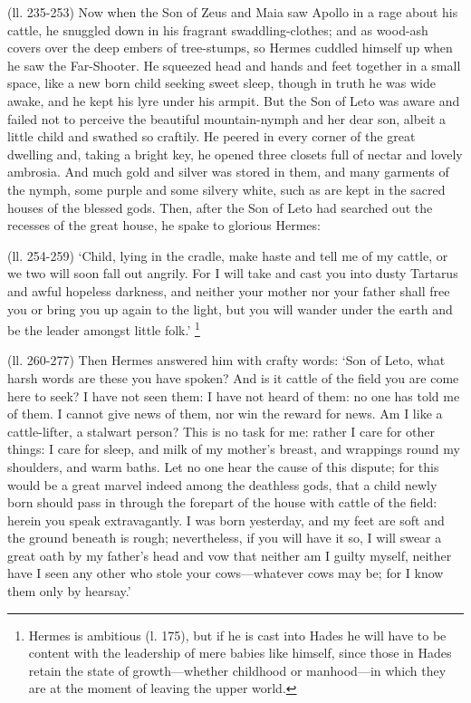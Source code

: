 (ll. 235-253) Now when the Son of Zeus and Maia saw Apollo in a rage about his
cattle, he snuggled down in his fragrant swaddling-clothes; and as wood-ash
covers over the deep embers of tree-stumps, so Hermes cuddled himself up when
he saw the Far-Shooter. He squeezed head and hands and feet together in a small
space, like a new born child seeking sweet sleep, though in truth he was wide
awake, and he kept his lyre under his armpit. But the Son of Leto was aware and
failed not to perceive the beautiful mountain-nymph and her dear son, albeit a
little child and swathed so craftily. He peered in every corner of the great
dwelling and, taking a bright key, he opened three closets full of nectar and
lovely ambrosia. And much gold and silver was stored in them, and many garments
of the nymph, some purple and some silvery white, such as are kept in the
sacred houses of the blessed gods. Then, after the Son of Leto had searched out
the recesses of the great house, he spake to glorious Hermes:

(ll. 254-259) ‘Child, lying in the cradle, make haste and tell me of my
cattle, or we two will soon fall out angrily. For I will take and cast you into
dusty Tartarus and awful hopeless darkness, and neither your mother nor your
father shall free you or bring you up again to the light, but you will wander
under the earth and be the leader amongst little folk.’ \footnote{Hermes is ambitious (l.
175), but if he is cast into Hades he will have to be content with the
leadership of mere babies like himself, since those in Hades retain the state
of growth—whether childhood or manhood—in which they are at the
moment of leaving the upper world.}

(ll. 260-277) Then Hermes answered him with crafty words: ‘Son of Leto,
what harsh words are these you have spoken? And is it cattle of the field you
are come here to seek? I have not seen them: I have not heard of them: no one
has told me of them. I cannot give news of them, nor win the reward for news.
Am I like a cattle-lifter, a stalwart person? This is no task for me: rather I
care for other things: I care for sleep, and milk of my mother’s breast,
and wrappings round my shoulders, and warm baths. Let no one hear the cause of
this dispute; for this would be a great marvel indeed among the deathless gods,
that a child newly born should pass in through the forepart of the house with
cattle of the field: herein you speak extravagantly. I was born yesterday, and
my feet are soft and the ground beneath is rough; nevertheless, if you will
have it so, I will swear a great oath by my father’s head and vow that
neither am I guilty myself, neither have I seen any other who stole your
cows—whatever cows may be; for I know them only by hearsay.’

